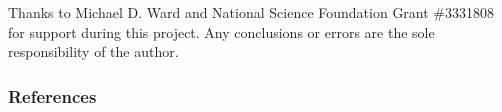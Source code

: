 \documentclass[12pt,letterpaper]{article} %
\begin{document}
Thanks to Michael D. Ward and National Science Foundation Grant \#3331808 for support during this project. Any conclusions or errors are the sole responsibility of the author.

\subsubsection*{References}



\begingroup
\renewcommand{\section}[2]{}


\endgroup
\end{document}
